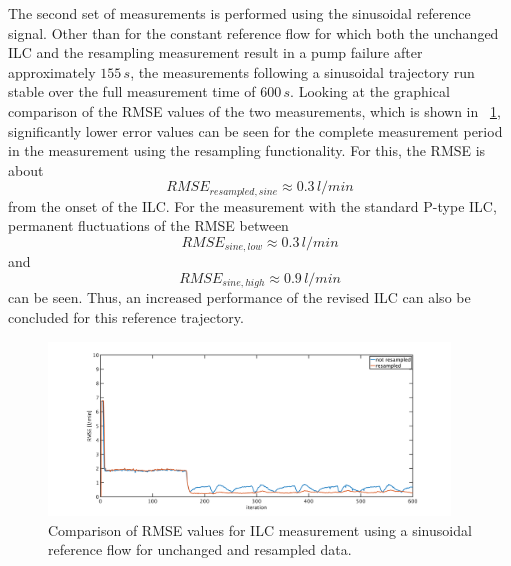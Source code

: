 The second set of measurements is performed using the sinusoidal reference signal. Other than for the constant reference flow for which both the unchanged ILC and the resampling measurement result in a pump failure after approximately $155\,s$, the measurements following a sinusoidal trajectory run stable over the full measurement time of $600\,s$.
Looking at the graphical comparison of the RMSE values of the two measurements, which is shown in \figurename~\ref{fig:RMSE_ilc_var_dist_comp_sine}, significantly lower error values can be seen for the complete measurement period in the measurement using the resampling functionality. For this, the RMSE is about
\begin{equation}
RMSE_{resampled,sine}\approx0.3\,l/min
\end{equation}
from the onset of the ILC. For the measurement with the standard P-type ILC, permanent fluctuations of the RMSE between
\begin{equation}
 RMSE_{sine,low}\approx0.3\,l/min
\end{equation}
and
\begin{equation}
 RMSE_{sine,high}\approx0.9\,l/min
\end{equation}
can be seen.
Thus, an increased performance of the revised ILC can also be concluded for this reference trajectory.
\begin{figure}[ht!]
  \centering
  \includegraphics[width=0.95\textwidth]{images/chapt_5/ILC/RMSE_ilc_var_dist_comp_sine.pdf}
  \caption[Comparison of RMSE values for ILC measurement using a sinusoidal reference flow for unchanged and resampled data]{Comparison of RMSE values for ILC measurement using a sinusoidal reference flow for unchanged and resampled data.}
  \label{fig:RMSE_ilc_var_dist_comp_sine}
\end{figure}

